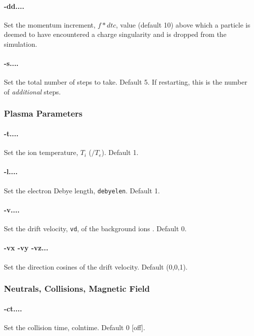 \documentclass[12pt]{article}
\begin{document}
\paragraph{-dd....}
Set the momentum increment, $f*dtc$, value (default 10) above which a
particle is deemed to have encountered a charge singularity and is
dropped from the simulation.

\paragraph{-s....}
Set the total number of steps to take. Default 5. 
If restarting, this is the number of \emph{additional} steps. 

\subsubsection*{Plasma Parameters}

\paragraph{-t....}  Set the ion temperature, $T_i$ ($/T_e$). Default 1.

\paragraph{-l....}  Set the electron Debye length, \verb!debyelen!. Default 1.

\paragraph{-v....}  Set the drift velocity, \verb!vd!, of the background ions . Default 0.

\paragraph{-vx -vy -vz...} Set the direction cosines of the drift
velocity. Default (0,0,1).

\subsubsection*{Neutrals, Collisions, Magnetic Field}

\paragraph{-ct....} Set the collision time, colntime. Default 0 [off].
\end{document}
